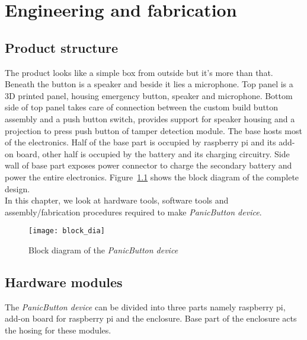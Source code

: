 
\chapter{Engineering and fabrication} 


\section{Product structure}
The product looks like a simple box from outside but it's more than that. Beneath the button is a speaker and beside it lies a microphone. Top panel is a 3D printed panel, housing emergency button, speaker and microphone. Bottom side of top panel takes care of connection between the custom build button assembly and a push button switch, provides support for speaker housing and a projection to press push button of tamper detection module. The base hosts most of the electronics. Half of the base part is occupied by raspberry pi and its add-on board, other half is occupied by the battery and its charging circuitry. Side wall of base part exposes power connector to charge the secondary battery and power the entire electronics. Figure~\ref{fig:block_dia} shows the block diagram of the complete design.\\
In this chapter, we look at hardware tools, software tools and assembly/fabrication procedures required to make \emph{PanicButton device}. 

\begin{figure}[H]
\centering
\texttt{[image: block\_dia]}
\caption{Block diagram of the \emph{PanicButton device}}
\label{fig:block_dia}
\end{figure}



\section{Hardware modules}
The \emph{PanicButton device} can be divided into three parts namely raspberry pi, add-on board for raspberry pi and the enclosure. Base part of the enclosure acts the hosing for these modules.

